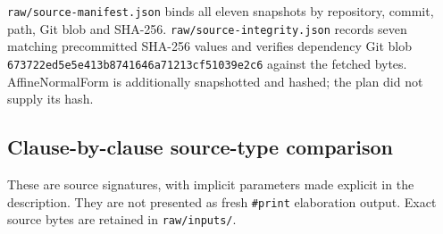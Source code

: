 \documentclass[10pt]{article}
\begin{document}
\texttt{raw\allowbreak{}/\allowbreak{}source\allowbreak{}-\allowbreak{}manifest\allowbreak{}.\allowbreak{}json} binds all eleven snapshots by repository, commit, path, Git blob and SHA-256. \texttt{raw\allowbreak{}/\allowbreak{}source\allowbreak{}-\allowbreak{}integrity\allowbreak{}.\allowbreak{}json} records seven matching precommitted SHA-256 values and verifies dependency Git blob \texttt{673722ed\allowbreak{}5e5e413b\allowbreak{}8741646a\allowbreak{}71213cf5\allowbreak{}1039e2c6} against the fetched bytes. AffineNormalForm is additionally snapshotted and hashed; the plan did not supply its hash.


\subsection*{Clause-by-clause source-type comparison}


These are source signatures, with implicit parameters made explicit in the description. They are not presented as fresh \texttt{\#print} elaboration output. Exact source bytes are retained in \texttt{raw\allowbreak{}/\allowbreak{}inputs\allowbreak{}/\allowbreak{}}.
\end{document}
